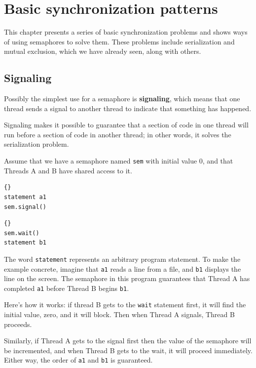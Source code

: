 \documentclass{book}
\begin{document}
\chapter{Basic synchronization patterns}

This chapter presents a series of basic synchronization problems and
shows ways of using semaphores to solve them.  These problems include
serialization and mutual exclusion, which we have already seen, along
with others.

\section{Signaling}

Possibly the simplest use for a semaphore is {\bf signaling},
which means that one thread sends a signal to another
thread to indicate that something has happened.

Signaling makes it possible to guarantee
that a section of code in one thread will run before a section of
code in another thread; in other words, it solves the serialization
problem.

Assume that we have a semaphore named {\tt sem} with initial value
0, and that Threads A and B have shared access to it.

\begin{minipage}[t]{0.4\textwidth}
    \begin{lstlisting}[title={Thread A}]{}
statement a1
sem.signal()
\end{lstlisting}
\end{minipage}
\hfill
\begin{minipage}[t]{0.4\textwidth}
    \begin{lstlisting}[title={Thread B}]{}
sem.wait()
statement b1
\end{lstlisting}
\end{minipage}

The word {\tt statement} represents an arbitrary program statement.
To make the example concrete, imagine that {\tt a1} reads a line
from a file, and {\tt b1} displays the line on the screen.
The semaphore in this program guarantees that Thread A
has completed {\tt a1} before Thread B begins {\tt b1}.

Here's how it works: if thread B gets to the
    {\tt wait} statement first, it will find the initial
value, zero, and it will block.  Then when Thread A signals,
Thread B proceeds.

Similarly, if Thread A gets to the signal first then the
value of the semaphore will be incremented, and when Thread
B gets to the wait, it will proceed immediately.
Either way, the order of {\tt a1} and {\tt b1} is guaranteed.
\end{document}
